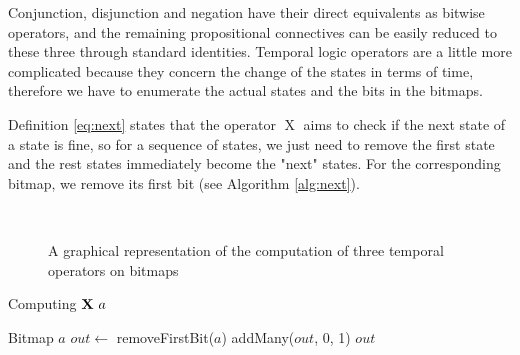 Conjunction, disjunction and negation have their direct equivalents as bitwise operators, and the remaining propositional connectives can be easily reduced to these three through standard identities. %
% 
%
Temporal logic operators are a little more complicated because they concern the change of the states in terms of time, therefore we have to enumerate the actual states and the bits in the bitmaps.

Definition \eqref{eq:next} states that the operator $\mathop{X}$ aims to check if the next state of a state is fine, so for a sequence of states, we just need to remove the first state and the rest states immediately become the "next" states. For the corresponding bitmap, we remove its first bit (see Algorithm \ref{alg:next}).

\begin{figure}
\centering
{}~~~
~~~
\caption{A graphical representation of the computation of three temporal operators on bitmaps}
\label{fig:patterns}
\end{figure}

\begin{algorithm}
\caption{Computing $\mathop{\mbox{\textbf{X}}}\, a$}
\label{alg:next}
\begin{algorithmic}[1]
\Require Bitmap $a$
\State $out \gets$ removeFirstBit($a$)
\State addMany($out$, 0, 1)
\State \Return $out$
\end{algorithmic}
\end{algorithm}

